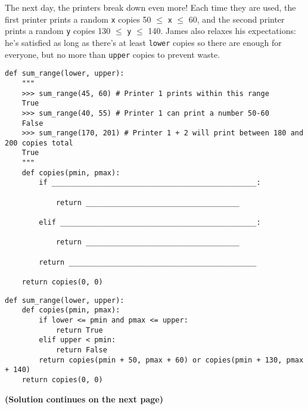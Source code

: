 \begin{blocksection}
\question The next day, the printers break down even more! Each time they are used, the first printer
prints a random \lstinline$x$ copies 50 $\leq$ \lstinline$x$ $\leq$ 60, and the second printer prints a
random \lstinline$y$ copies 130 $\leq$ \lstinline$y$ $\leq$ 140. James also relaxes his expectations: he's
satisfied as long as there's at least \lstinline$lower$ copies so there are enough for everyone, but no
more than \lstinline$upper$ copies to prevent waste. \\

\begin{lstlisting}
def sum_range(lower, upper):
    """
    >>> sum_range(45, 60) # Printer 1 prints within this range
    True
    >>> sum_range(40, 55) # Printer 1 can print a number 50-60
    False
    >>> sum_range(170, 201) # Printer 1 + 2 will print between 180 and 200 copies total
    True
    """
    def copies(pmin, pmax):
        if ________________________________________________:

            return ____________________________________

        elif ______________________________________________:

            return ____________________________________

        return ____________________________________________

    return copies(0, 0)

\end{lstlisting}
\end{blocksection}

\begin{solution}[1.5in]
\begin{blocksection}
\begin{lstlisting}
def sum_range(lower, upper):
    def copies(pmin, pmax):
        if lower <= pmin and pmax <= upper:
            return True
        elif upper < pmin:
            return False
        return copies(pmin + 50, pmax + 60) or copies(pmin + 130, pmax + 140)
    return copies(0, 0)
\end{lstlisting}

\textbf{(Solution continues on the next page)}
\end{blocksection}
\end{solution}

